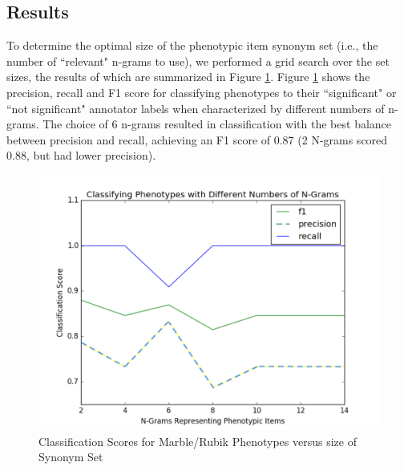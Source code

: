 \documentclass{sig-alternate}
\begin{document}

\subsection{Results}
To determine the optimal size of the phenotypic item synonym set (i.e., the number of ``relevant" n-grams to use), we performed a grid search over the set sizes, the results of which are summarized in Figure \ref{fig:classificationVarNG}.
Figure \ref{fig:classificationVarNG} shows the precision, recall and F1 score for classifying phenotypes to their ``significant" or ``not significant" annotator labels when characterized by different numbers of n-grams. 
The choice of 6 n-grams resulted in classification with the best balance between precision and recall, achieving an F1 score of 0.87 (2 N-grams scored 0.88, but had lower precision).

\begin{figure} [t]
\centering
\includegraphics[width=\linewidth] {classificationWithVariableNG_edit.png}
\caption{Classification Scores for Marble/Rubik Phenotypes versus size of Synonym Set}
\label{fig:classificationVarNG}
\end{figure}
\end{document}
